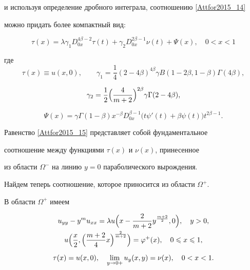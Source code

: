 и используя определение дробного интеграла, соотношению \eqref{Attfor2015_14} 

можно придать более компактный вид:

\begin{equation}

\label{Attfor2015_15}

\tau(x)=\lambda\gamma_1 D_{0x}^{4\beta-2}\tau(t)+

\gamma_2 D_{0x}^{2\beta-1}\nu(t)+\Psi(x), \quad 0<x<1

\end{equation}

где $$\tau(x)\equiv u(x , 0), \qquad

\gamma_1=\frac{1}{4}(2-4\beta)^{4\beta}

\gamma B(1-2\beta , 1-\beta)\Gamma(4\beta),

$$

$$

\gamma_2=\frac{1}{2}\Bigl(\frac{4}{m+2}\Bigr)^{2\beta}

\gamma \Gamma(2-4\beta),

$$

$$

\Psi(x)=\gamma\Gamma(1-\beta)x^{-\beta} D_{0x}^{\beta-1}

\bigl( t\psi'(t)+\beta\psi(t) \bigr)t^{2\beta-1}.

$$



Равенство \eqref{Attfor2015_15} представляет собой фундаментальное 

соотношение между функциями $\tau(x)$ и $\nu(x)$, принесенное 

из области $\Omega^-$ на линию $y=0$ параболического вырождения.

Найдем теперь соотношение, которое приносится из области $\Omega^+$.



В области $\Omega^+$  имеем

\begin{gather}

\label{Attfor2015_16}

u_{yy}-y^m u_{xx}=\lambda  u\Bigl( x-\frac{2}{m+2} y^{\frac{m+2}{2}} , 0\Bigr) ,\quad y>0,

\\

\label{Attfor2015_18}

u\Bigl(\frac{x}{2},\Bigl( \frac{m+2}{4} x\Bigr)^{\frac{2}{m+2}} \Bigr)=\varphi^+(x) ,\quad 0\leqslant x\leqslant 1,

\\[2mm]

\label{Attfor2015_18}

\tau(x)= u(x , 0),\quad  \lim\limits_{y\rightarrow 0+}u_y(x,y)=\nu(x) ,\quad 0<x<1.

\end{gather}



